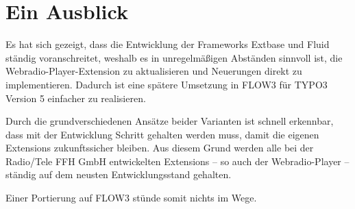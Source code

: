 \section{Ein Ausblick}
\label{sec:EinAusblick}

Es hat sich gezeigt, dass die Entwicklung der Frameworks Extbase und Fluid st\"andig voranschreitet, weshalb es in unregelm\"a{\ss}igen Abst\"anden sinnvoll ist, die Webradio-Player-Extension zu aktualisieren und Neuerungen direkt zu implementieren. Dadurch ist eine sp\"atere Umsetzung in FLOW3 f\"ur TYPO3 Version 5 einfacher zu realisieren. 

Durch die grundverschiedenen Ans\"atze beider Varianten ist schnell erkennbar, dass mit der Entwicklung Schritt gehalten werden muss, damit die eigenen Extensions zukunftssicher bleiben. Aus diesem Grund werden alle bei der Radio/Tele FFH GmbH entwickelten Extensions -- so auch der Webradio-Player -- st\"andig auf dem neusten Entwicklungsstand gehalten. 

Einer Portierung auf FLOW3 st\"unde somit nichts im Wege.




